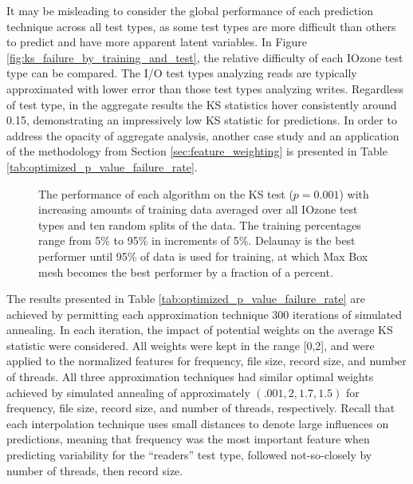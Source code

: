 \documentclass[smallextended]{svjour3}       %
\begin{document}
It may be misleading to consider the global performance of each prediction technique across all test types, as some test types are more difficult than others to predict and have more apparent latent variables. In Figure \ref{fig:ks_failure_by_training_and_test}, the relative difficulty of each IOzone test type can be compared. The I/O test types analyzing reads are typically approximated with lower error than those test types analyzing writes. Regardless of test type, in the aggregate results the KS statistics hover consistently around 0.15, demonstrating an impressively low KS statistic for predictions. In order to address the opacity of aggregate analysis, another case study and an application of the methodology from Section \ref{sec:feature_weighting} is presented in Table \ref{tab:optimized_p_value_failure_rate}.

\begin{figure}
  \caption{The performance of each algorithm on the KS test ($p=0.001$) with increasing amounts of training data averaged over all IOzone test types and ten random splits of the data. The training percentages range from 5\% to 95\% in increments of 5\%. Delaunay is the best performer until 95\% of data is used for training, at which Max Box mesh becomes the best performer by a fraction of a percent.
  \vspace{-.1cm}}
  \label{fig:ks_failure_by_training}
\end{figure}

The results presented in Table \ref{tab:optimized_p_value_failure_rate} are achieved by permitting each approximation technique 300 iterations of simulated annealing. In each iteration, the impact of potential weights on the average KS statistic were considered. All weights were kept in the range [0,2], and were applied to the normalized features for frequency, file size, record size, and number of threads. All three approximation techniques had similar optimal weights achieved by simulated annealing of approximately $(.001, 2, 1.7, 1.5)$ for frequency, file size, record size, and number of threads, respectively. Recall that each interpolation technique uses small distances to denote large influences on predictions, meaning that frequency was the most important feature when predicting variability for the ``readers'' test type, followed not-so-closely by number of threads, then record size.
\end{document}
